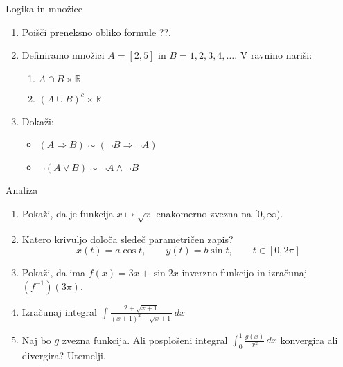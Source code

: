 \begin{frame}{Logika in množice}
	\begin{enumerate}
		\item
		Poišči preneksno obliko formule ??.
		\item 
		Definiramo množici $A = [2,5]$ in $B = {1,2,3,4,\dots}$.
		V ravnino nariši:
		\begin{enumerate}
		   \item $A \cap B \times \mathbb{R}$
		   \item $(A \cup B)^c \times \mathbb{R}$
		\end{enumerate}
		\item
		Dokaži:
		\begin{itemize}
			\item $(A \Rightarrow B) \sim (\neg B \Rightarrow \neg A)$
			\item $\neg (A \lor B ) \sim \neg A \land \neg B $
		\end{itemize}
	\end{enumerate}
\end{frame}

\begin{frame}{Analiza}
	\begin{enumerate}
		\item
		Pokaži, da je funkcija $x \mapsto \sqrt{x}$ enakomerno zvezna na $[0, \infty)$.
		\item 
		Katero krivuljo določa sledeč parametričen zapis?
		$$
		   x(t) = a\cos t,\qquad%
		   y(t) = b\sin t,\qquad %
		   t \in [0, 2 \pi]
		$$ 
		\item
		Pokaži, da ima $f(x) = 3x + \sin 2x$ inverzno funkcijo in izračunaj $(f^{-1})(3 \pi)$.
		
		\item
		Izračunaj integral 
		$\displaystyle\int \frac{2+\sqrt{x+1}}{(x+1)^2-\sqrt{x+1}}\, dx$
		\item 
		Naj bo $g$ zvezna funkcija. Ali posplošeni integral 
		$\int_{0}^{1} \frac{g(x)}{x^2}\, dx$
		konvergira ali divergira? Utemelji.
	\end{enumerate}
\end{frame}

